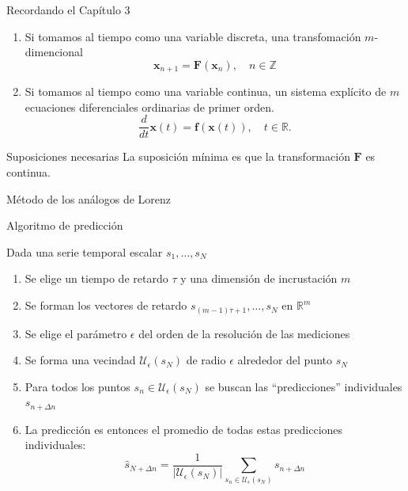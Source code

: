 \documentclass[11pt]{beamer}
\begin{document}
\begin{frame}{Recordando el Capítulo 3}
\small
\begin{block}{}
\begin{enumerate}
\item Si tomamos al tiempo como una variable discreta, una transfomación $m$-dimencional
\begin{equation}
\mathbf{x}_{n+1} = \mathbf{F}(\mathbf{x}_n), \quad n \in \mathbb{Z}
\end{equation}			
\item Si tomamos al tiempo como una variable continua, un sistema explícito de $m$ ecuaciones diferenciales ordinarias de primer orden.
\begin{equation}
\frac{d}{dt}\mathbf{x}(t) = \mathbf{f}(\mathbf{x}(t)), \quad t \in \mathbb{R}.
\end{equation}
\end{enumerate}
\end{block}
\begin{block}{Suposiciones necesarias}
La suposición mínima es que la transformación $\mathbf{F}$ es continua.
\end{block}
\end{frame}

\begin{frame}{Método de los análogos de Lorenz}

\end{frame}

\begin{frame}{Algoritmo de predicción}
\small
\begin{block}{Dada una serie temporal escalar $s_1, \ldots, s_N$}
\begin{enumerate}
\item Se elige un tiempo de retardo $\tau$ y una dimensión de incrustación $m$
\item Se forman los vectores de retardo $s_{(m-1)\tau+1}, \ldots, s_N$ en $\mathbb{R}^m$
\item Se elige el parámetro $\epsilon$ del orden de la resolución de las mediciones
\item Se forma una vecindad $\mathcal{U}_\epsilon(s_N)$ de radio $\epsilon$ alrededor del punto $s_N$
\item Para todos los puntos $s_n \in \mathcal{U}_\epsilon(s_N)$ se buscan las “predicciones” individuales $s_{n+\Delta n}$
\item La predicción es entonces el promedio de todas estas predicciones individuales:
\[
\hat{s}_{N+\Delta n} = \frac{1}{|\mathcal{U}_\epsilon(s_N)|} \sum_{s_n \in \mathcal{U}_\epsilon(s_N)} s_{n+\Delta n}
\]
\end{enumerate}
\end{block}
\end{frame}
\end{document}
